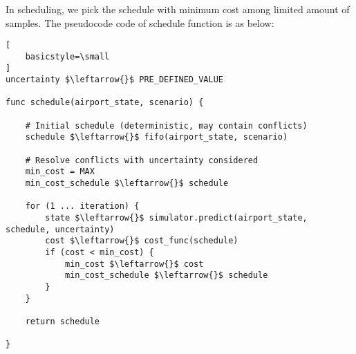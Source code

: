 \documentclass[a4paper]{article}
\begin{document}
In scheduling, we pick the schedule with minimum cost among limited amount of samples. The pseudocode code of schedule function is as below:

\begin{lstlisting}[
    basicstyle=\small
]
uncertainty $\leftarrow{}$ PRE_DEFINED_VALUE

func schedule(airport_state, scenario) {

    # Initial schedule (deterministic, may contain conflicts)
    schedule $\leftarrow{}$ fifo(airport_state, scenario)

    # Resolve conflicts with uncertainty considered
    min_cost = MAX
    min_cost_schedule $\leftarrow{}$ schedule

    for (1 ... iteration) {
        state $\leftarrow{}$ simulator.predict(airport_state, schedule, uncertainty)
        cost $\leftarrow{}$ cost_func(schedule)
        if (cost < min_cost) {
            min_cost $\leftarrow{}$ cost
            min_cost_schedule $\leftarrow{}$ schedule
        }
    }

    return schedule

}

\end{lstlisting}
\end{document}

